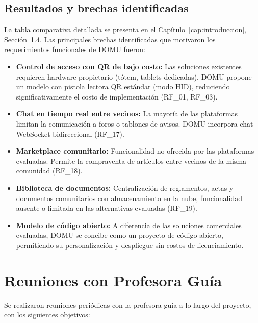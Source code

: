 \subsection{Resultados y brechas identificadas}

La tabla comparativa detallada se presenta en el Capítulo~\ref{cap:introduccion}, Sección~1.4. Las principales brechas identificadas que motivaron los requerimientos funcionales de DOMU fueron:

\begin{itemize}
    \item \textbf{Control de acceso con QR de bajo costo:} Las soluciones existentes requieren hardware propietario (tótem, tablets dedicadas). DOMU propone un modelo con pistola lectora QR estándar (modo HID), reduciendo significativamente el costo de implementación (RF\_01, RF\_03).

    \item \textbf{Chat en tiempo real entre vecinos:} La mayoría de las plataformas limitan la comunicación a foros o tablones de avisos. DOMU incorpora chat WebSocket bidireccional (RF\_17).

    \item \textbf{Marketplace comunitario:} Funcionalidad no ofrecida por las plataformas evaluadas. Permite la compraventa de artículos entre vecinos de la misma comunidad (RF\_18).

    \item \textbf{Biblioteca de documentos:} Centralización de reglamentos, actas y documentos comunitarios con almacenamiento en la nube, funcionalidad ausente o limitada en las alternativas evaluadas (RF\_19).

    \item \textbf{Modelo de código abierto:} A diferencia de las soluciones comerciales evaluadas, DOMU se concibe como un proyecto de código abierto, permitiendo su personalización y despliegue sin costos de licenciamiento.
\end{itemize}

\section{Reuniones con Profesora Guía}

Se realizaron reuniones periódicas con la profesora guía a lo largo del proyecto, con los siguientes objetivos:

